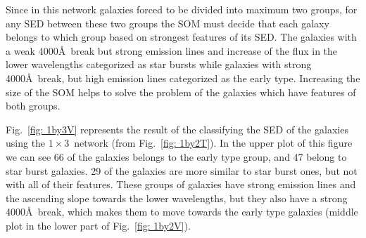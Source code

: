             Since in this network galaxies forced to be divided into maximum two groups, for any SED between these two groups the SOM must decide that each galaxy belongs to which group based on strongest features of its SED.
            The galaxies with a weak 4000\AA~break but strong emission lines and increase of the flux in the lower wavelengths categorized as star bursts while galaxies with strong 4000\AA~break, but high emission lines categorized as the early type.
            Increasing the size of the SOM helps to solve the problem of the galaxies which have features of both groups.
            
             Fig.~\ref{fig: 1by3V} represents the result of the classifying the SED of the galaxies using the $1\times3$~network (from Fig.~\ref{fig: 1by2T}). 
             In the upper plot of this figure we can see 66 of the galaxies belongs to the early type group, and 47 belong to star burst galaxies. 
             29 of the galaxies are more similar to star burst ones, but not with all of their features. 
             These groups of galaxies have strong emission lines and the ascending slope towards the lower wavelengths, but they also have a strong 4000\AA~break, which makes them to move towards the early type galaxies (middle plot in the lower part of Fig.~\ref{fig: 1by2V}).

